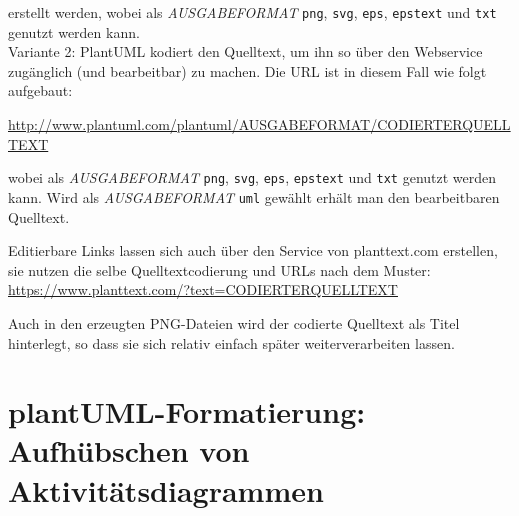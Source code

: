 \documentclass[10pt]{scrartcl}
\begin{document}
erstellt werden, wobei als \textit{AUSGABEFORMAT} \texttt{png}, \texttt{svg}, \texttt{eps}, \texttt{epstext} und \texttt{txt} genutzt werden kann.\\

Variante 2: PlantUML kodiert den Quelltext, um ihn so über den Webservice zugänglich (und bearbeitbar) zu machen. Die URL ist in diesem Fall wie folgt aufgebaut:

\href{http://www.plantuml.com/plantuml/uml/fPA_JWCn3CPdyXHM5yfmBr09gVy40rMNWX28nStvxg9BdCfnE07YtScfAdHWWcon_VtysSayAOhcu4tg7HzGCC2Q6inURoBh5WF1P9Ejgn5so0dktmuqY5EIYJdJF2HQOQ8F0-KiezGag-YZm1gbttbKMlfCnopQlfMOkJvM35sXfH1xCfzdn6tKF-4shktqYRoFG-6T0HTMe_pRu3bG90w_GSpbBJ59yG3lES264Z6yHXwtL8rhgjOEsu889KwE6xGToSnuQXGqWemZGEs4hBh8XRVebR8uXeQIUcgBpk0u3ypkYa_7Cy04DYUDWQG8JWy2DJMENJ73C0rEuPcS9yvXBzbsyCBNMngyOxeoEP4T5TD752ePs9TUPGRYgn7-VJFcr0UgwYTy0SRCYUlobxu0}{http://www.plantuml.com/plantuml/AUSGABEFORMAT/CODIERTERQUELLTEXT}  

wobei als \textit{AUSGABEFORMAT} \texttt{png}, \texttt{svg}, \texttt{eps}, \texttt{epstext} und \texttt{txt} genutzt werden kann. Wird als \textit{AUSGABEFORMAT} \texttt{uml} gewählt erhält man den bearbeitbaren Quelltext.

Editierbare Links lassen sich auch über den Service von planttext.com erstellen, sie nutzen die selbe Quelltextcodierung und URLs nach dem Muster:
\href{https://www.planttext.com/?text=bPBFJW8n4CRlVOg9Bs2ywhe199u8CS6OU2pjiDjijqEcKpQ4y6RUV35Ry028YVOuVxxVV5ywYg9PKkzLx5nOQzOzJ76bavTd2ZBNFSBDB1bdDInqYF2wNUF0Jf1lrCdEs8ZREDdk5EGtqQPhc5AmJ-I98GOQZWrYYtmiJZLt2wy59pxXeJjrkgTWBxURbg8CRMQUJVqgfVOdXyr9SFS7zYLqvffMtj7xVFd-p2ap3LUnwf2bkb-ODWSaSFS0AcGySD620wQgF1djNnXDzk34KQZhRriO4Tw8bsXTQ59ee4ynGhMiDyJLxR8-AenJN7r-j5m6RDbX67T51v1pmtk1Y2wen_pEa3d4wyovDkrFQCZLGlqN58E5OZb7GMi5EPDHBfNlzGK0}{https://www.planttext.com/?text=CODIERTERQUELLTEXT}

Auch in den erzeugten PNG-Dateien wird der codierte Quelltext als Titel hinterlegt, so dass sie sich relativ einfach später weiterverarbeiten lassen.
\newpage
\section{plantUML-Formatierung: Aufhübschen von Aktivitätsdiagrammen}
\end{document}
